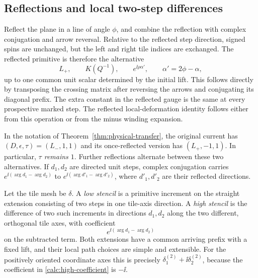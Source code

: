 \subsection{Reflections and local two-step differences}
\label{calc:reflection}

Reflect the plane in a line of angle $\phi$, and combine the reflection
with complex conjugation and arrow reversal.  Relative to the reflected
step direction, signed spins are unchanged, but the left and right
tile indices are exchanged.  The reflected primitive is therefore the
alternative
\begin{equation}
 L_+,\qquad K(Q^{-1}),\qquad
 e^{\ii\rho\alpha'},\qquad \alpha'=2\phi-\alpha,
 \label{calc:reflected-current}
\end{equation}
up to one common unit scalar determined by the initial lift.  This
follows directly by transposing the crossing matrix after reversing
the arrows and conjugating its diagonal prefix.  The extra constant
in the reflected gauge is the same at every prospective marked
step.  The reflected local-deformation identity follows either from
this operation or from the minus winding expansion.

In the notation of Theorem~\ref{thm:physical-transfer}, the original
current has $(D,\epsilon,\tau)=(L_-,1,1)$ and its once-reflected version
has $(L_+,-1,1)$.  In particular, \emph{$\tau$ remains $1$}.  Further
reflections alternate between these two alternatives.  If $d_1,d_2$
are directed unit steps, complex conjugation carries
$e^{\ii(\arg d_1-\arg d_2)}$ to
$e^{\ii(\arg d'_1-\arg d'_2)}$, where $d'_1,d'_2$ are their reflected
directions.

Let the tile mesh be $\delta$.  A \emph{low stencil} is a primitive
increment on the straight extension consisting of two steps in one
tile-axis direction.  A \emph{high stencil} is the difference of two
such increments in directions $d_1,d_2$ along the two different,
orthogonal tile axes, with
coefficient
\begin{equation}
 e^{\ii(\arg d_1-\arg d_2)}
 \label{calc:high-coefficient}
\end{equation}
on the subtracted term.  Both extensions have a common arriving
prefix with a fixed lift, and their local path choices are simple
and extensible.  For the positively oriented coordinate axes this
is precisely $\delta^{(2)}_1+\ii\delta^{(2)}_2$, because the coefficient
in \eqref{calc:high-coefficient} is $-\ii$.

